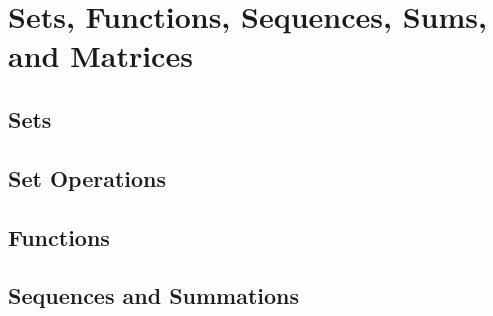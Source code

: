\documentclass[../discrete.tex]{subfiles}
\begin{document}
\chapter{Sets, Functions, Sequences, Sums, and Matrices}
\section{Sets}
\section{Set Operations}
\section{Functions}
\section{Sequences and Summations}
\end{document}
